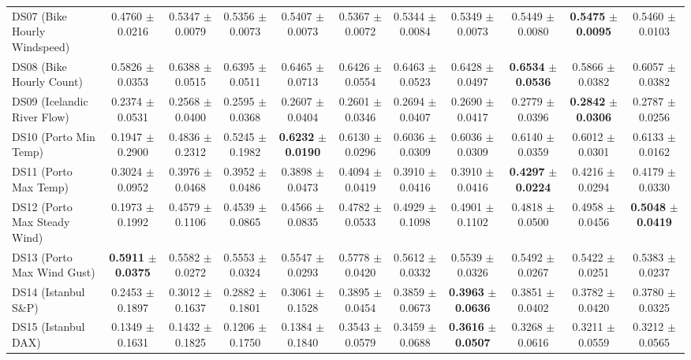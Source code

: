 \begin{table}[t]
{{\begin{tabular}{lcccccccccc}
DS07 (Bike Hourly Windspeed) & 0.4760 $\pm$ 0.0216 & 0.5347 $\pm$ 0.0079 & 0.5356 $\pm$ 0.0073 & 0.5407 $\pm$ 0.0073 & 0.5367 $\pm$ 0.0072 & 0.5344 $\pm$ 0.0084 & 0.5349 $\pm$ 0.0073 & 0.5449 $\pm$ 0.0080 & \textbf{0.5475} $\pm$ \textbf{0.0095} & 0.5460 $\pm$ 0.0103 \\
DS08 (Bike Hourly Count) & 0.5826 $\pm$ 0.0353 & 0.6388 $\pm$ 0.0515 & 0.6395 $\pm$ 0.0511 & 0.6465 $\pm$ 0.0713 & 0.6426 $\pm$ 0.0554 & 0.6463 $\pm$ 0.0523 & 0.6428 $\pm$ 0.0497 & \textbf{0.6534} $\pm$ \textbf{0.0536} & 0.5866 $\pm$ 0.0382 & 0.6057 $\pm$ 0.0382 \\
DS09 (Icelandic River Flow) & 0.2374 $\pm$ 0.0531 & 0.2568 $\pm$ 0.0400 & 0.2595 $\pm$ 0.0368 & 0.2607 $\pm$ 0.0404 & 0.2601 $\pm$ 0.0346 & 0.2694 $\pm$ 0.0407 & 0.2690 $\pm$ 0.0417 & 0.2779 $\pm$ 0.0396 & \textbf{0.2842} $\pm$ \textbf{0.0306} & 0.2787 $\pm$ 0.0256 \\
DS10 (Porto Min Temp) & 0.1947 $\pm$ 0.2900 & 0.4836 $\pm$ 0.2312 & 0.5245 $\pm$ 0.1982 & \textbf{0.6232} $\pm$ \textbf{0.0190} & 0.6130 $\pm$ 0.0296 & 0.6036 $\pm$ 0.0309 & 0.6036 $\pm$ 0.0309 & 0.6140 $\pm$ 0.0359 & 0.6012 $\pm$ 0.0301 & 0.6133 $\pm$ 0.0162 \\
DS11 (Porto Max Temp) & 0.3024 $\pm$ 0.0952 & 0.3976 $\pm$ 0.0468 & 0.3952 $\pm$ 0.0486 & 0.3898 $\pm$ 0.0473 & 0.4094 $\pm$ 0.0419 & 0.3910 $\pm$ 0.0416 & 0.3910 $\pm$ 0.0416 & \textbf{0.4297} $\pm$ \textbf{0.0224} & 0.4216 $\pm$ 0.0294 & 0.4179 $\pm$ 0.0330 \\
DS12 (Porto Max Steady Wind) & 0.1973 $\pm$ 0.1992 & 0.4579 $\pm$ 0.1106 & 0.4539 $\pm$ 0.0865 & 0.4566 $\pm$ 0.0835 & 0.4782 $\pm$ 0.0533 & 0.4929 $\pm$ 0.1098 & 0.4901 $\pm$ 0.1102 & 0.4818 $\pm$ 0.0500 & 0.4958 $\pm$ 0.0456 & \textbf{0.5048} $\pm$ \textbf{0.0419} \\
DS13 (Porto Max Wind Gust) & \textbf{0.5911} $\pm$ \textbf{0.0375} & 0.5582 $\pm$ 0.0272 & 0.5553 $\pm$ 0.0324 & 0.5547 $\pm$ 0.0293 & 0.5778 $\pm$ 0.0420 & 0.5612 $\pm$ 0.0332 & 0.5539 $\pm$ 0.0326 & 0.5492 $\pm$ 0.0267 & 0.5422 $\pm$ 0.0251 & 0.5383 $\pm$ 0.0237 \\
DS14 (Istanbul S\&P) & 0.2453 $\pm$ 0.1897 & 0.3012 $\pm$ 0.1637 & 0.2882 $\pm$ 0.1801 & 0.3061 $\pm$ 0.1528 & 0.3895 $\pm$ 0.0454 & 0.3859 $\pm$ 0.0673 & \textbf{0.3963} $\pm$ \textbf{0.0636} & 0.3851 $\pm$ 0.0402 & 0.3782 $\pm$ 0.0420 & 0.3780 $\pm$ 0.0325 \\
DS15 (Istanbul DAX) & 0.1349 $\pm$ 0.1631 & 0.1432 $\pm$ 0.1825 & 0.1206 $\pm$ 0.1750 & 0.1384 $\pm$ 0.1840 & 0.3543 $\pm$ 0.0579 & 0.3459 $\pm$ 0.0688 & \textbf{0.3616} $\pm$ \textbf{0.0507} & 0.3268 $\pm$ 0.0616 & 0.3211 $\pm$ 0.0559 & 0.3212 $\pm$ 0.0565 \\

\end{tabular}}}
\end{table}
